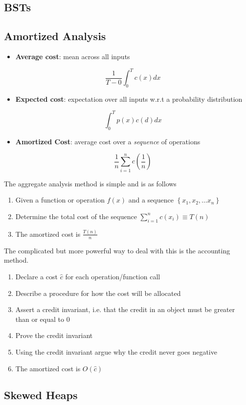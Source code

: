 \documentclass[../notes.tex]{subfiles}
\begin{document}
\subsection{BSTs}


\subsection{Amortized Analysis}
\begin{definition}

	\begin{itemize}
		\item \textbf{Average cost}: mean across all inputs

			\begin{equation}
				\frac{1}{T-0} \int_{0}^{T} c(x) dx 
			\end{equation}
			
		\item \textbf{Expected cost}: expectation over all inputs w.r.t a probability distribution

			\begin{equation}
				\int_{0}^{T}   p(x) c(d) dx
			\end{equation}
			
		\item \textbf{Amortized Cost}: average cost over a \textit{sequence} of operations

			\begin{equation}
				\frac{1}{n} \sum_{i=1}^{n} c(\frac{1}{n})
			\end{equation}
	\end{itemize}

\end{definition}

The aggregate analysis method is simple and is as follows

\begin{enumerate}
	\item Given a function or operation $ f(x) $ and a sequence $ \left\{ x_1, x_2, \ldots x_n \right\}  $
	\item Determine the total cost of the sequence $ \sum_{i=1}^{n} c(x_i) \equiv T(n) $
	\item The amortized cost is $ \frac{T(n)}{n} $
\end{enumerate}

The complicated but more powerful way to deal with this is the accounting method.


\begin{enumerate}
	\item Declare a cost $ \hat{c} $ for each operation/function call
	\item Describe a procedure for how the cost will be allocated
	\item Assert a credit invariant, i.e. that the credit in an object must be greater than or equal to 0
	\item Prove the credit invariant
	\item Using the credit invariant argue why the credit never goes negative
	\item The amortized cost is $ O(\hat{c}) $
\end{enumerate}



\subsection{Skewed Heaps}




\end{document}
